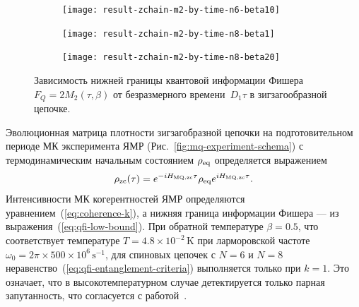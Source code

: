 \begin{figure}[H]
  \begin{subfigure}[t]{0.32\textwidth}
    \texttt{[image: result-zchain-m2-by-time-n6-beta10]}
    \caption{\protect}
    \label{fig:result-zchain-m2-by-time-n6-beta10}
  \end{subfigure}
  \hfill
  \begin{subfigure}[t]{0.32\textwidth}
    \texttt{[image: result-zchain-m2-by-time-n8-beta1]}
    \caption{\protect}
    \label{fig:result-zchain-m2-by-time-n8-beta1}
  \end{subfigure}
  \hfill
  \begin{subfigure}[t]{0.32\textwidth}
    \texttt{[image: result-zchain-m2-by-time-n8-beta20]}
    \caption{\protect}
    \label{fig:result-zchain-m2-by-time-n8-beta20}
  \end{subfigure}
  \caption{
    Зависимость нижней границы квантовой информации Фишера~$F_Q=2M_2(\tau, \beta)$
    от безразмерного времени~$D_1\tau$
    в зигзагообразной цепочке.
  }
\end{figure}


Эволюционная матрица плотности зигзагобразной цепочки на подготовительном периоде МК эксперимента ЯМР (Рис.~\ref{fig:mq-experiment-schema})
с термодинамическим начальным состоянием $\rho_\mathrm{eq}$
определяется выражением
%
\begin{equation}\label{eq:rho-eval-zchain}
  \rho_\mathrm{zc}(\tau) = e^{-i H_\mathrm{MQ, zc} \tau}
    \rho_\mathrm{eq} e^{i H_\mathrm{MQ, zc} \tau}.
\end{equation}
%
Интенсивности  МК когерентностей ЯМР определяются уравнением~(\ref{eq:coherence-k}),
а нижняя граница информации Фишера --- из выражения~(\ref{eq:qfi-low-bound}).
При обратной температуре $\beta=0.5$,
что соответствует температуре $T=4.8 \times 10^{-2}\,\mbox{K}$
при ларморовской частоте $\omega_0=2\pi\times 500\times 10^6 \,\mbox{s}^{-1}$,
для спиновых цепочек с $N=6$ и $N=8$
неравенство~(\ref{eq:qfi-entanglement-criteria})  выполняется только при $k=1$.
Это означает, что в высокотемпературном случае
детектируется только парная запутанность,
что согласуется с работой~\cite{Feldman2012}.

